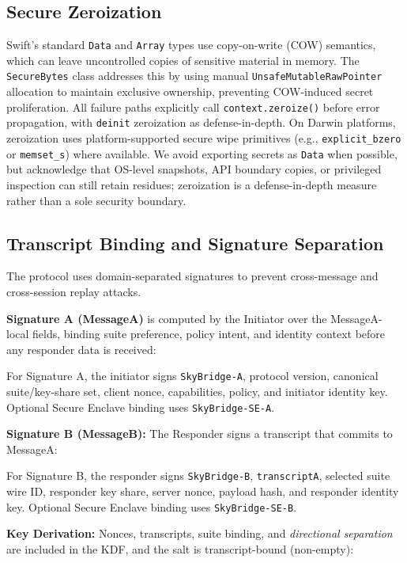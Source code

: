 \documentclass[10pt,journal,compsoc]{IEEEtran}
\begin{document}
\subsection{Secure Zeroization}\label{e.-secure-zeroization}

Swift's standard \texttt{Data} and \texttt{Array} types use copy-on-write (COW) semantics, which can leave uncontrolled copies of sensitive material in memory. The \texttt{SecureBytes} class addresses this by using manual \texttt{UnsafeMutableRawPointer} allocation to maintain exclusive ownership, preventing COW-induced secret proliferation. All failure paths explicitly call \texttt{context.zeroize()} before error propagation, with \texttt{deinit} zeroization as defense-in-depth. On Darwin platforms, zeroization uses platform-supported secure wipe primitives (e.g., \texttt{explicit\_bzero} or \texttt{memset\_s}) where available. We avoid exporting secrets as \texttt{Data} when possible, but acknowledge that OS-level snapshots, API boundary copies, or privileged inspection can still retain residues; zeroization is a defense-in-depth measure rather than a sole security boundary.

\subsection{Transcript Binding and Signature
Separation}\label{f.-transcript-binding-and-signature-separation}

The protocol uses domain-separated signatures to prevent cross-message
and cross-session replay attacks.

\textbf{Signature A (MessageA)} is computed by the Initiator over the
MessageA-local fields, binding suite preference, policy intent, and
identity context before any responder data is received:

For Signature A, the initiator signs \texttt{SkyBridge-A}, protocol
version, canonical suite/key-share set, client nonce, capabilities,
policy, and initiator identity key. Optional Secure Enclave binding
uses \texttt{SkyBridge-SE-A}.

\textbf{Signature B (MessageB):} The Responder signs a transcript that
commits to MessageA:

For Signature B, the responder signs \texttt{SkyBridge-B},
\texttt{transcriptA}, selected suite wire ID, responder key share,
server nonce, payload hash, and responder identity key. Optional Secure
Enclave binding uses \texttt{SkyBridge-SE-B}.

\textbf{Key Derivation:} Nonces, transcripts, suite binding, and
\emph{directional separation} are included in the KDF, and the salt is
transcript-bound (non-empty):
\end{document}
